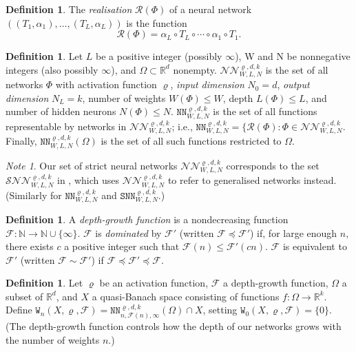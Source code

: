 \documentclass{article}
\theoremstyle{definition}
\newtheorem{definition}[theorem]{Definition}
\theoremstyle{remark}
\newtheorem*{note}{Note}
\begin{document}
\begin{definition}
    The \textit{realisation} $\mathcal{R}(\Phi)$ of a neural network $((T_1,\alpha_1),\ldots,(T_L,\alpha_L))$ is the function
    \[\mathcal{R}(\Phi) = \alpha_L \circ T_L \circ \cdots \circ \alpha_1 \circ T_1.\]
\end{definition}

\begin{definition}
    Let $L$ be a positive integer (possibly $\infty$), W and N be nonnegative integers (also possibly $\infty$), and $\Omega \subset \mathbb{R}^d$ nonempty. $\mathcal{NN}_{W,L,N}^{\varrho,d,k}$ is the set of all networks $\Phi$ with activation function $\varrho$, \textit{input dimension} $N_0 = d$, \textit{output dimension} $N_L = k$, number of weights $W(\Phi) \leq W$, depth $L(\Phi) \leq L$, and number of hidden neurons $N(\Phi) \leq N$. $\mathtt{NN}_{W,L,N}^{\varrho,d,k}$ is the set of all functions representable by networks in $\mathcal{NN}_{W,L,N}^{\varrho,d,k}$; i.e., $\mathtt{NN}_{W,L,N}^{\varrho,d,k} = \{ \mathcal{R}(\Phi): \Phi \in \mathcal{NN}_{W,L,N}^{\varrho,d,k}$. Finally, $\mathtt{NN}_{W,L,N}^{\varrho,d,k}(\Omega)$ is the set of all such functions restricted to $\Omega$.
\end{definition}

\begin{note}
    Our set of strict neural networks $\mathcal{NN}_{W,L,N}^{\varrho,d,k}$ corresponds to the set $\mathcal{SNN}_{W,L,N}^{\varrho,d,k}$ in \cite{gribonval_approximation_2022}, which uses $\mathcal{NN}_{W,L,N}^{\varrho,d,k}$ to refer to generalised networks instead. (Similarly for $\mathtt{NN}_{W,L,N}^{\varrho,d,k}$ and $\mathtt{SNN}_{W,L,N}^{\varrho,d,k}$.)
\end{note}

\begin{definition}
    A \textit{depth-growth function} is a nondecreasing function $\mathcal{F}: \mathbb{N} \to \mathbb{N} \cup \{ \infty \}$. $\mathcal{F}$ is \textit{dominated} by $\mathcal{F}'$ (written $\mathcal{F} \preceq \mathcal{F}'$) if, for large enough $n$, there exists $c$ a positive integer such that $\mathcal{F}(n) \leq \mathcal{F}'(cn)$. $\mathcal{F}$ is equivalent to $\mathcal{F}'$ (written $\mathcal{F} \sim \mathcal{F}'$) if $\mathcal{F} \preceq \mathcal{F}' \preceq \mathcal{F}$.
\end{definition}

\begin{definition}
    Let $\varrho$ be an activation function, $\mathcal{F}$ a depth-growth function, $\Omega$ a subset of $\mathbb{R}^d$, and $X$ a quasi-Banach space consisting of functions $f: \Omega \to \mathbb{R}^k$. Define $\mathtt{W}_n(X,\varrho,\mathcal{F}) = \mathtt{NN}_{n,\mathcal{F}(n),\infty}^{\varrho,d,k}(\Omega) \cap X$, setting $\mathtt{W}_0(X,\varrho,\mathcal{F}) = \{ 0 \}$. (The depth-growth function controls how the depth of our networks grows with the number of weights $n$.)
\end{definition}
\end{document}
